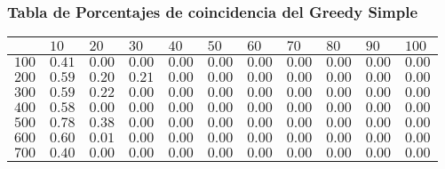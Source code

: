 \documentclass[12pt]{article}
\begin{document}
\subsubsection*{Tabla de Porcentajes de coincidencia del Greedy Simple}
\begin{tabu}{|@{}*{11}{p{1.4cm}@{}|}}
%
& $10$ & $20$ & $30$ & $40$ & $50$ & $60$ & $70$ & $80$ & $90$ & $100$ \\\hline
$100$ & $0.41$ & $0.00$ & $0.00$ & $0.00$ & $0.00$ & $0.00$ & $0.00$ & $0.00$ & $0.00$ & $0.00$ \\\hline
$200$ & $0.59$ & $0.20$ & $0.21$ & $0.00$ & $0.00$ & $0.00$ & $0.00$ & $0.00$ & $0.00$ & $0.00$ \\\hline
$300$ & $0.59$ & $0.22$ & $0.00$ & $0.00$ & $0.00$ & $0.00$ & $0.00$ & $0.00$ & $0.00$ & $0.00$ \\\hline
$400$ & $0.58$ & $0.00$ & $0.00$ & $0.00$ & $0.00$ & $0.00$ & $0.00$ & $0.00$ & $0.00$ & $0.00$ \\\hline
$500$ & $0.78$ & $0.38$ & $0.00$ & $0.00$ & $0.00$ & $0.00$ & $0.00$ & $0.00$ & $0.00$ & $0.00$ \\\hline
$600$ & $0.60$ & $0.01$ & $0.00$ & $0.00$ & $0.00$ & $0.00$ & $0.00$ & $0.00$ & $0.00$ & $0.00$ \\\hline
$700$ & $0.40$ & $0.00$ & $0.00$ & $0.00$ & $0.00$ & $0.00$ & $0.00$ & $0.00$ & $0.00$ & $0.00$ \\\hline

\end{tabu}
\end{document}
